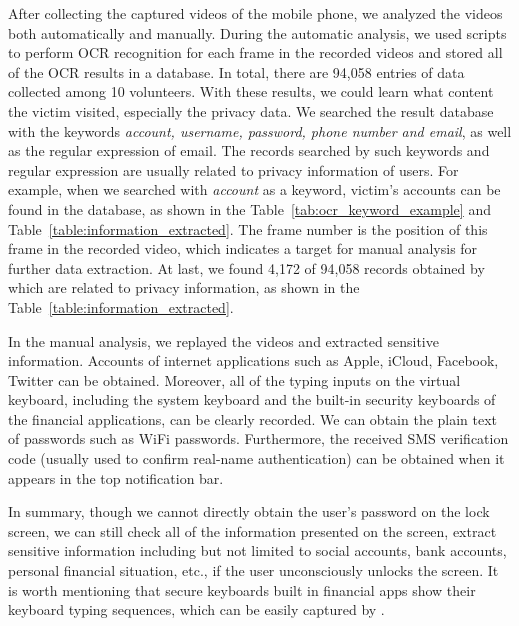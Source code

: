 After collecting the captured videos of the mobile phone, we analyzed the videos both automatically and manually.
During the automatic analysis, we used scripts to perform \ac{OCR} recognition for each frame in the recorded videos and stored all of the \ac{OCR} results in a database.
In total, there are 94,058 entries of data collected among 10 volunteers.
With these results, we could learn what content the victim visited, especially the privacy data.
We searched the result database with the keywords \textit{account, username, password, phone number and email}, as well as the regular expression of email.
The records searched by such keywords and regular expression are usually related to privacy information of users.
For example, when we searched with \textit{account} as a keyword, victim's accounts can be found in the database, as shown in the Table~\ref{tab:ocr_keyword_example} and Table~\ref{table:information_extracted}.
The frame number is the position of this frame in the recorded video, which indicates a target for manual analysis for further data extraction.
At last, we found 4,172 of 94,058 records obtained by \tool which are related to privacy information, as shown in the Table~\ref{table:information_extracted}.


In the manual analysis, we replayed the videos and extracted sensitive information.
Accounts of internet applications such as Apple, iCloud, Facebook, Twitter can be obtained.
Moreover, all of the typing inputs on the virtual keyboard, including the system keyboard and the built-in security keyboards of the financial applications, can be clearly recorded.
We can obtain the plain text of passwords such as WiFi passwords.
Furthermore, the received SMS verification code (usually used to confirm real-name authentication) can be obtained when it appears in the top notification bar.

In summary, though we cannot directly obtain the user's password on the lock screen, we can still check all of the information presented on the screen, extract sensitive information including but not limited to social accounts, bank accounts, personal financial situation, etc., if the user unconsciously unlocks the screen.
It is worth mentioning that {secure keyboards} built in financial apps show their keyboard typing sequences, which can be easily captured by \tool.

